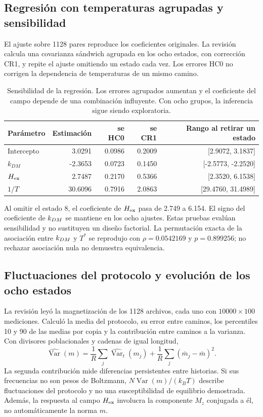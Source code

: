 \subsection{Regresión con temperaturas agrupadas y sensibilidad}

El ajuste sobre 1128 pares reproduce los coeficientes originales. La revisión calcula una covarianza sándwich agrupada en los ocho estados, con corrección CR1, y repite el ajuste omitiendo un estado cada vez. Los errores HC0 no corrigen la dependencia de temperaturas de un mismo camino.

\begin{table}[H]\centering\small
\caption{Sensibilidad de la regresión. Los errores agrupados aumentan y el coeficiente del campo depende de una combinación influyente. Con ocho grupos, la inferencia sigue siendo exploratoria.}
\begin{tabular}{lrrrr}\toprule Parámetro & Estimación & se HC0 & se CR1 & Rango al retirar un estado\\\midrule
Intercepto & 3.0291 & 0.0986 & 0.2009 & [2.9072, 3.1837] \\
$k_{DM}$ & -2.3653 & 0.0723 & 0.1450 & [-2.5773, -2.2520] \\
$H_{\mathrm{ex}}$ & 2.7487 & 0.2170 & 0.5366 & [2.3520, 6.1538] \\
$1/T$ & 30.6096 & 0.7916 & 2.0863 & [29.4760, 31.4989] \\
\bottomrule\end{tabular}\end{table}

Al omitir el estado 8, el coeficiente de $H_{\mathrm{ex}}$ pasa de 2.749 a 6.154. El signo del coeficiente de $k_{DM}$ se mantiene en los ocho ajustes. Estas pruebas evalúan sensibilidad y no sustituyen un diseño factorial. La permutación exacta de la asociación entre $k_{DM}$ y $T^*$ se reprodujo con $\rho=0.0542169$ y $p=0.899256$; no rechazar asociación nula no demuestra equivalencia.

\subsection{Fluctuaciones del protocolo y evolución de los ocho estados}

La revisión leyó la magnetización de los 1128 archivos, cada uno con $10000\times100$ mediciones. Calculó la media del protocolo, su error entre caminos, los percentiles 10 y 90 de las medias por copia y la contribución entre caminos a la varianza. Con divisores poblacionales y cadenas de igual longitud,
\begin{equation}
\widehat{\operatorname{Var}}(m)=\frac1R\sum_j\widehat{\operatorname{Var}}_t(m_j)+\frac1R\sum_j(\bar m_j-\bar m)^2.
\end{equation}
La segunda contribución mide diferencias persistentes entre historias. Si sus frecuencias no son pesos de Boltzmann, $N\operatorname{Var}(m)/(k_BT)$ describe fluctuaciones del protocolo y no una susceptibilidad de equilibrio demostrada. Además, la respuesta al campo $H_{\mathrm{ex}}$ involucra la componente $M_z$ conjugada a él, no automáticamente la norma $m$.

